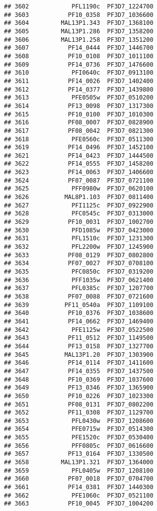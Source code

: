 \documentclass{article}\usepackage[]{graphicx}\usepackage[]{color}
\makeatletter
\newenvironment{kframe}{%
 \def\at@end@of@kframe{}%
 \ifinner\ifhmode%
  \def\at@end@of@kframe{\end{minipage}}%
  \begin{minipage}{\columnwidth}%
 \fi\fi%
 \def\FrameCommand##1{\hskip\@totalleftmargin \hskip-\fboxsep
 \colorbox{shadecolor}{##1}\hskip-\fboxsep
     \hskip-\linewidth \hskip-\@totalleftmargin \hskip\columnwidth}%
 \MakeFramed {\advance\hsize-\width
   \@totalleftmargin\z@ \linewidth\hsize
   \@setminipage}}%
 {\par\unskip\endMakeFramed%
 \at@end@of@kframe}
\newenvironment{knitrout}{}{} %
\makeatother
\begin{document}
\begin{knitrout}
\begin{kframe}
\begin{verbatim}
## 3602            PFL1190c  PF3D7_1224700
## 3603           PF10_0358  PF3D7_1036600
## 3604         MAL13P1.343  PF3D7_1368100
## 3605         MAL13P1.286  PF3D7_1358200
## 3606         MAL13P1.258  PF3D7_1351200
## 3607           PF14_0444  PF3D7_1446700
## 3608           PF10_0108  PF3D7_1011100
## 3609           PF14_0736  PF3D7_1476600
## 3610            PFI0640c  PF3D7_0913100
## 3611           PF14_0026  PF3D7_1402400
## 3612           PF14_0377  PF3D7_1439800
## 3613            PFE0505w  PF3D7_0510200
## 3614           PF13_0098  PF3D7_1317300
## 3615           PF10_0100  PF3D7_1010300
## 3616           PF08_0007  PF3D7_0828900
## 3617           PF08_0042  PF3D7_0821300
## 3618            PFE0560c  PF3D7_0511300
## 3619           PF14_0496  PF3D7_1452100
## 3621           PF14_0423  PF3D7_1444500
## 3622           PF14_0555  PF3D7_1458200
## 3623           PF14_0063  PF3D7_1406600
## 3624           PF07_0087  PF3D7_0721100
## 3625            PFF0980w  PF3D7_0620100
## 3626          MAL8P1.103  PF3D7_0811400
## 3627            PFI1125c  PF3D7_0922900
## 3628            PFC0545c  PF3D7_0313000
## 3629           PF10_0031  PF3D7_1002700
## 3630            PFD1085w  PF3D7_0423000
## 3631            PFL1510c  PF3D7_1231300
## 3632            PFL2200w  PF3D7_1245900
## 3633           PF08_0129  PF3D7_0802800
## 3634           PF07_0027  PF3D7_0708100
## 3635            PFC0850c  PF3D7_0319200
## 3636            PFF1035w  PF3D7_0621400
## 3637            PFL0385c  PF3D7_1207700
## 3638           PF07_0088  PF3D7_0721600
## 3639          PF11_0540a  PF3D7_1109100
## 3640           PF10_0376  PF3D7_1038600
## 3641           PF14_0662  PF3D7_1469400
## 3642            PFE1125w  PF3D7_0522500
## 3643           PF11_0512  PF3D7_1149500
## 3644           PF13_0158  PF3D7_1327700
## 3645          MAL13P1.20  PF3D7_1303900
## 3646           PF14_0114  PF3D7_1411600
## 3647           PF14_0355  PF3D7_1437500
## 3648           PF10_0369  PF3D7_1037600
## 3649           PF13_0346  PF3D7_1365900
## 3650           PF10_0226  PF3D7_1023300
## 3651           PF08_0131  PF3D7_0802200
## 3652           PF11_0308  PF3D7_1129700
## 3653            PFL0430w  PF3D7_1208600
## 3654            PFE0715w  PF3D7_0514300
## 3655            PFE1520c  PF3D7_0530400
## 3656            PFF0805c  PF3D7_0616600
## 3657           PF13_0164  PF3D7_1330500
## 3658         MAL13P1.321  PF3D7_1364000
## 3659            PFL0405w  PF3D7_1208100
## 3660           PF07_0018  PF3D7_0704700
## 3661           PF14_0381  PF3D7_1440300
## 3662            PFE1060c  PF3D7_0521100
## 3663           PF10_0045  PF3D7_1004200

\end{verbatim}
\end{kframe}
\end{knitrout}
\end{document}

